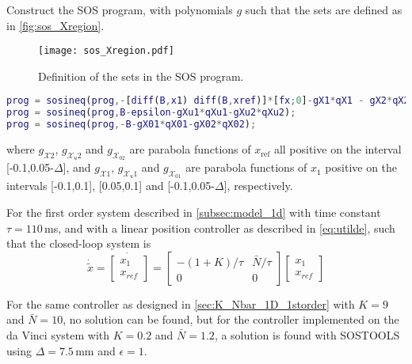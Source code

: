 Construct the SOS program, with polynomials $g$ such that the sets are defined as in \autoref{fig:sos_Xregion}.
\begin{figure}[H]
	\centering
\texttt{[image: sos\_Xregion.pdf]}
\caption{Definition of the sets in the SOS program.}
\label{fig:sos_Xregion}
\end{figure}

\begin{lstlisting}[language=matlab]
prog = sosineq(prog,-[diff(B,x1) diff(B,xref)]*[fx;0]-gX1*qX1 - gX2*qX2);
prog = sosineq(prog,B-epsilon-gXu1*qXu1-gXu2*qXu2);
prog = sosineq(prog,-B-gX01*qX01-gX02*qX02);
\end{lstlisting}

where $g_{\mathcal{X}2}$, $g_{\mathcal{X}_u2}$ and $g_{\mathcal{X}_02}$ are parabola functions of $x_\text{ref}$ all positive on the interval [-0.1,0.05-$\Delta$], and $g_{\mathcal{X}1}$, $g_{\mathcal{X}_u1}$ and $g_{\mathcal{X}_01}$ are parabola functions of $x_1$ positive on the intervals [-0.1,0.1], [0.05,0.1] and [-0.1,0.05-$\Delta$], respectively.

For the first order system described in \autoref{subsec:model_1d} with time constant $\tau=110$\,ms, and with a linear position controller as described in \autoref{eq:utilde}, such that the closed-loop system is
\begin{equation}
\dot{\tilde{x}}=
\dot{\begin{bmatrix}
	x_1\\x_{ref}
	\end{bmatrix}} =
\begin{bmatrix}
-(1+K)/\tau & \bar{N}/\tau\\0&0
\end{bmatrix}
\begin{bmatrix}
x_1\\x_{ref}
\end{bmatrix}
\end{equation}

For the same controller as designed in \autoref{sec:K_Nbar_1D_1storder} with $K=9$ and $\bar{N}=10$, no solution can be found, but for the controller implemented on the da Vinci system with $K=0.2$ and $\bar{N}=1.2$, a solution is found with SOSTOOLS using $\Delta=7.5$\,mm and $\epsilon=1$.

